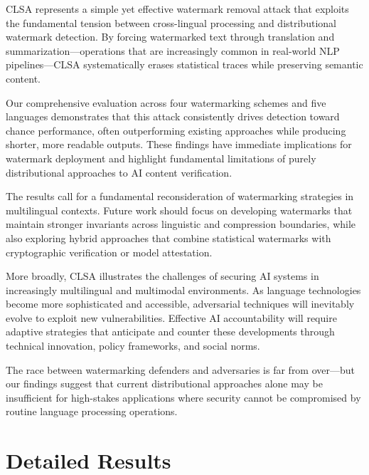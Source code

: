 \documentclass{article}
\begin{document}
CLSA represents a simple yet effective watermark removal attack that exploits the fundamental tension between cross-lingual processing and distributional watermark detection. By forcing watermarked text through translation and summarization—operations that are increasingly common in real-world NLP pipelines—CLSA systematically erases statistical traces while preserving semantic content.

Our comprehensive evaluation across four watermarking schemes and five languages demonstrates that this attack consistently drives detection toward chance performance, often outperforming existing approaches while producing shorter, more readable outputs. These findings have immediate implications for watermark deployment and highlight fundamental limitations of purely distributional approaches to AI content verification.

The results call for a fundamental reconsideration of watermarking strategies in multilingual contexts. Future work should focus on developing watermarks that maintain stronger invariants across linguistic and compression boundaries, while also exploring hybrid approaches that combine statistical watermarks with cryptographic verification or model attestation.

More broadly, CLSA illustrates the challenges of securing AI systems in increasingly multilingual and multimodal environments. As language technologies become more sophisticated and accessible, adversarial techniques will inevitably evolve to exploit new vulnerabilities. Effective AI accountability will require adaptive strategies that anticipate and counter these developments through technical innovation, policy frameworks, and social norms.

The race between watermarking defenders and adversaries is far from over—but our findings suggest that current distributional approaches alone may be insufficient for high-stakes applications where security cannot be compromised by routine language processing operations.




\appendix

\section{Detailed Results}
\end{document}
